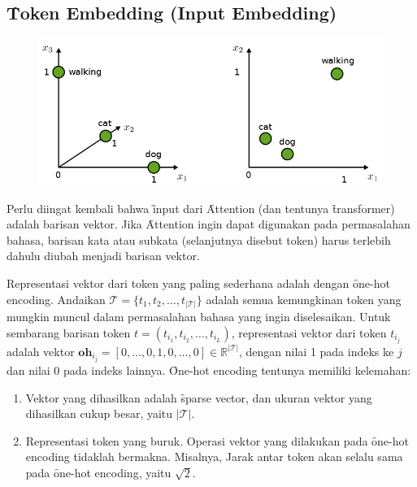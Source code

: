 	\subsection{\f{Token Embedding (Input Embedding)}}
	\label{sec:token-embedding}
	\begin{figure}
		\centering
		\includegraphics[width=1\textwidth]{assets/pics/token-embedding.png}
		\label{fig:token-embedding}
	\end{figure}
	Perlu diingat kembali bahwa \f{input} dari \f{Attention} (dan tentunya \f{transformer}) adalah barisan vektor. Jika \f{Attention} ingin dapat digunakan pada permasalahan bahasa, barisan kata atau subkata (selanjutnya disebut token) harus terlebih dahulu diubah menjadi barisan vektor.

	Representasi vektor dari token yang paling sederhana adalah dengan \f{one-hot encoding}. Andaikan $\mathcal{T} = \{t_1, t_2, \dots, t_{|\mathcal{T}|}\}$ adalah semua kemungkinan token yang mungkin muncul dalam permasalahan bahasa yang ingin diselesaikan. Untuk sembarang barisan token $t = (t_{i_1}, t_{i_2}, \dots, t_{i_L})$, representasi vektor dari token $t_{i_j}$ adalah vektor $\mathbf{oh}_{i_j} = [0, \dots, 0, 1, 0, \dots, 0] \in \mathbb{R}^{|\mathcal{T}|}$, dengan nilai 1 pada indeks ke $j$ dan nilai 0 pada indeks lainnya. \f{One-hot encoding} tentunya memiliki kelemahan:
	\begin{enumerate}
		\item Vektor yang dihasilkan adalah \f{sparse vector}, dan ukuran vektor yang dihasilkan cukup besar, yaitu $|\mathcal{T}|$.
		\item Representasi token yang buruk. Operasi vektor yang dilakukan pada \f{one-hot encoding} tidaklah bermakna. Misalnya, Jarak antar token akan selalu sama pada \f{one-hot encoding}, yaitu $\sqrt{2}$.
	\end{enumerate}

